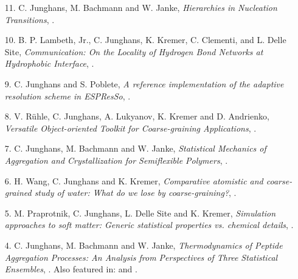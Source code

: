 \documentclass{article}
\begin{document}
\begin{enumerate}
\item[11.] C. Junghans, M. Bachmann and W. Janke,
  \textit{Hierarchies in Nucleation Transitions},
  .

\item[10.] B. P. Lambeth, Jr., C. Junghans, K. Kremer, C. Clementi, and L. Delle Site, 
  \textit{Communication: On the Locality of Hydrogen Bond Networks at Hydrophobic Interface},
  .

\item[9.] C. Junghans and S. Poblete,
  \textit{A reference implementation of the adaptive resolution scheme in ESPResSo},
  .

\item[8.] V. R{\"u}hle, C. Junghans, A. Lukyanov, K. Kremer and D. Andrienko,
  \textit{Versatile Object-oriented Toolkit for Coarse-graining Applications},
  . 

\item[7.] C. Junghans, M. Bachmann and W. Janke,
  \textit{Statistical Mechanics of Aggregation and Crystallization for Semiflexible Polymers},
  .

\item[6.] H. Wang, C. Junghans and K. Kremer,
  \textit{Comparative atomistic and coarse-grained study of water: What do we lose by coarse-graining?},
  .

\item[5.] M. Praprotnik, C. Junghans, L. Delle Site and K. Kremer,
  \textit{Simulation approaches to soft matter: Generic statistical properties vs. chemical details},
  .

\item[4.] C. Junghans, M. Bachmann and W. Janke,
  \textit{Thermodynamics of Peptide Aggregation Processes: An Analysis from Perspectives of Three Statistical Ensembles},
   .
  Also featured in:  and .


\end{enumerate}
\end{document}
